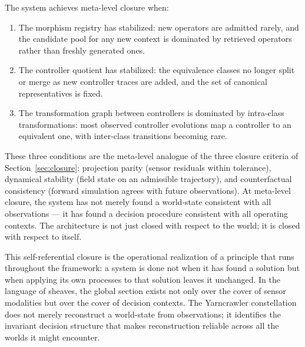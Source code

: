 \documentclass[11pt, oneside]{article}
\begin{document}
The system achieves meta-level closure when:
\begin{enumerate}
\item The morphism registry has stabilized: new operators are admitted rarely, and the
candidate pool for any new context is dominated by retrieved operators rather than
freshly generated ones.
\item The controller quotient has stabilized: the equivalence classes no longer split
or merge as new controller traces are added, and the set of canonical representatives
is fixed.
\item The transformation graph between controllers is dominated by intra-class
transformations: most observed controller evolutions map a controller to an equivalent
one, with inter-class transitions becoming rare.
\end{enumerate}
These three conditions are the meta-level analogue of the three closure criteria of
Section~\ref{sec:closure}: projection parity (sensor residuals within tolerance),
dynamical stability (field state on an admissible trajectory), and counterfactual
consistency (forward simulation agrees with future observations). At meta-level closure,
the system has not merely found a world-state consistent with all observations --- it has
found a decision procedure consistent with all operating contexts. The architecture is
not just closed with respect to the world; it is closed with respect to itself.

This self-referential closure is the operational realization of a principle that runs
throughout the framework: a system is done not when it has found a solution but when
applying its own processes to that solution leaves it unchanged. In the language of
sheaves, the global section exists not only over the cover of sensor modalities but over
the cover of decision contexts. The Yarncrawler constellation does not merely reconstruct
a world-state from observations; it identifies the invariant decision structure that
makes reconstruction reliable across all the worlds it might encounter.
\end{document}
